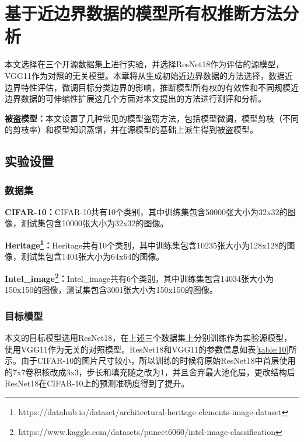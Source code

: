 
\chapter{基于近边界数据的模型所有权推断方法分析}\label{5}

本文选择在三个开源数据集上进行实验，并选择ResNet18作为评估的源模型，VGG11作为对照的无关模型。本章将从生成初始近边界数据的方法选择，数据近边界特性评估，微调目标分类边界的影响，推断模型所有权的有效性和不同规模近边界数据的可伸缩性扩展这几个方面对本文提出的方法进行测评和分析。

\noindent\textbf{被盗模型：}本文设置了几种常见的模型盗窃方法，包括模型微调，模型剪枝（不同的剪枝率）和模型知识蒸馏，并在源模型的基础上派生得到被盗模型。

\section{实验设置}\label{5.1}

\subsection{数据集}

\noindent\textbf{CIFAR-10\cite{krizhevsky2009learning}：}CIFAR-10共有10个类别，其中训练集包含50000张大小为32x32的图像，测试集包含10000张大小为32x32的图像。

\noindent\textbf{Heritage\footnote{https://datahub.io/dataset/architectural-heritage-elements-image-dataset}：}Heritage共有10个类别，其中训练集包含10235张大小为128x128的图像，测试集包含1404张大小为64x64的图像。

\noindent\textbf{Intel\_image\footnote{https://www.kaggle.com/datasets/puneet6060/intel-image-classification}：}Intel\_image共有6个类别，其中训练集包含14034张大小为150x150的图像，测试集包含3001张大小为150x150的图像。

\subsection{目标模型}

本文的目标模型选用ResNet18，在上述三个数据集上分别训练作为实验源模型，使用VGG11作为无关的对照模型。ResNet18和VGG11的参数信息如表\ref{table:10}所示。由于CIFAR-10的图片尺寸较小，所以训练的时候将原始ResNet18中首层使用的7x7卷积核改成3x3，步长和填充随之改为1，并且舍弃最大池化层，更改结构后ResNet18在CIFAR-10上的预测准确度得到了提升。

